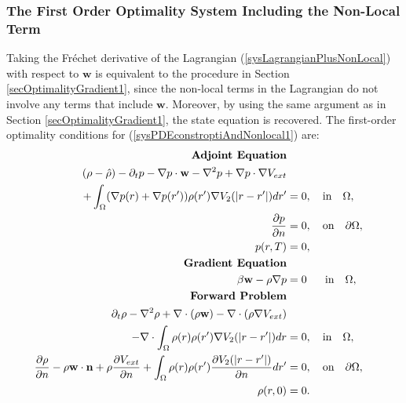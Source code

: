 \subsubsection{The First Order Optimality System Including the Non-Local Term}
Taking the Fr\'echet derivative of the Lagrangian (\ref{sysLagrangianPlusNonLocal}) with respect to $\mathbf{w}$ is equivalent to the procedure in Section \ref{secOptimalityGradient1}, since the non-local terms in the Lagrangian do not involve any terms that include $\mathbf{w}$. 
Moreover, by using the same argument as in Section \ref{secOptimalityGradient1}, the state equation is recovered. 
The first-order optimality conditions for (\ref{sysPDEconstroptiAndNonlocal1}) are:
\begin{align}\label{sysFirstOderOptimalityNonLocal1}
\textbf{Adjoint Equation} \notag \\
 (\rho- \hat{\rho})   - \partial_t  p - \nabla p \cdot  \mathbf{w} - \nabla^2 p
+  \nabla p \cdot \nabla V_{ext}&\\ 
+ \int_\Omega (\nabla  p(r)+\nabla  p(r')) \rho(r') \nabla V_2(|r-r'|) dr' &=0,  \quad \text{in} \quad  \Omega, \notag\\
\frac{\partial p }{\partial n}&=0, \quad \text{on} \quad \partial \Omega, \notag\\
p(r,T)&=0,\notag \\
\textbf{Gradient Equation} \notag \\
\beta \mathbf{w}  - \rho \nabla p &=0 \quad \ \ \text{in} \quad \Omega, \notag \\
\textbf{Forward Problem} \notag \\
\partial_t \rho - \nabla^2 \rho + \nabla \cdot (\rho \mathbf{w}) - \nabla \cdot (\rho \nabla V_{ext})& \notag\\
- \nabla \cdot \int_\Omega \rho(r) \rho(r') \nabla V_2(|r-r'|) dr&=0, \quad \text{in} \quad \Omega,\notag\\
\dfrac{\partial \rho}{\partial n} - \rho \mathbf{w} \cdot \mathbf{n} + \rho \dfrac{\partial V_{ext}}{\partial n}+\int_\Omega \rho(r) \rho(r') \frac{\partial V_2(|r-r'|)}{\partial n} dr' &=0,\quad \text{on} \quad  \partial \Omega, \notag\\
\rho(r,0)&=0 \notag.
\end{align}









